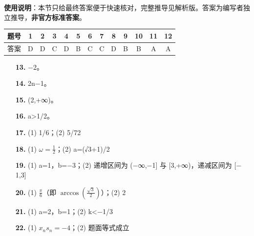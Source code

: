 
\begin{gknotice}
\textbf{使用说明}：本节只给最终答案便于快速核对，完整推导见解析版。答案为编写者独立推导，\textbf{非官方标准答案}。
\end{gknotice}

\begin{center}\begin{tabular}{ccccccccccccc}
\toprule
题号 & 1 & 2 & 3 & 4 & 5 & 6 & 7 & 8 & 9 & 10 & 11 & 12 \\
\midrule
答案 & D & D & C & D & B & C & C & D & B & B & A & A \\
\bottomrule
\end{tabular}\end{center}

\begin{itemize}[leftmargin=2.6em]
  \item[\textbf{13.}] $-$2。
  \item[\textbf{14.}] 2n$-$1。
  \item[\textbf{15.}] (2,+∞)。
  \item[\textbf{16.}] a>1/2。
\end{itemize}

\begin{itemize}[leftmargin=2.6em]
  \item[\textbf{17.}] (1) 1/6；(2) 5/72
  \item[\textbf{18.}] (1) $\omega=\frac12$；(2) a=(√3+1)/2
  \item[\textbf{19.}] (1) a=1，b=$-$3；(2) 递增区间为 ($-$∞,$-$1] 与 [3,+∞)，递减区间为 [$-$1,3]
  \item[\textbf{20.}] (1) $\frac{\pi}{6}$（即 $\arccos\left(\frac{\sqrt3}{2}\right)$）；(2) 2
  \item[\textbf{21.}] (1) a=2，b=1；(2) k<$-$1/3
  \item[\textbf{22.}] (1) $x_ns_n=-4$；(2) 题面等式成立
\end{itemize}

